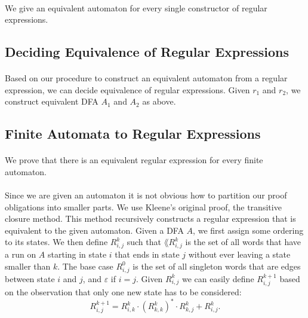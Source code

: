\documentclass[11pt,a4paper,oneside]{book}
\begin{document}
                \paragraph{} 
                    We give an equivalent automaton for every single constructor of regular expressions.


            \subsection{Deciding Equivalence of Regular Expressions}

                \paragraph{} 
                    Based on our procedure to construct an equivalent automaton from a regular expression, we can decide equivalence of regular expressions. Given $r_1$ and $r_2$, we construct equivalent DFA $A_1$ and $A_2$ as above.
                    

            \subsection{Finite Automata to Regular Expressions}
                \paragraph{}
                    We prove that there is an equivalent regular expression for every finite automaton.

                
                \paragraph{}
                    Since we are given an automaton it is not obvious how to partition our proof obligations into smaller parts.
                    We use Kleene's original proof, the transitive closure method. 
                    This method recursively constructs a regular expression that is equivalent to the given automaton.
                    Given a DFA $A$, we first assign some ordering to its states. We then define $R^k_{i,j}$ such that 
                    $\lang{R^k_{i,j}}$ is the set of all words that have a run on $A$ starting in state $i$ that ends in state $j$ without ever leaving a state smaller than $k$. 
                    The base case $R^{0}_{i,j}$ is the set of all singleton words that are edges between state $i$ and $j$, and $\varepsilon$ if $i=j$. 
                    Given $R^k_{i,j}$ we can easily define $R^{k+1}_{i,j}$ based on the observation that only one new state has to be considered:
                    \[
                        R^{k+1}_{i,j} = R^{k}_{i,k} \cdot (R^{k}_{k,k})^* \cdot R^{k}_{k,j} + R^{k}_{i,j}.
                    \]
\end{document}
